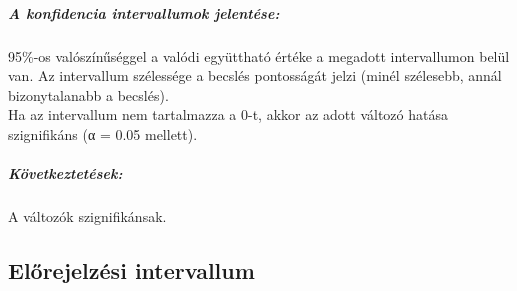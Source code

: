 \documentclass[11pt]{article}
\begin{document}
\subparagraph{A konfidencia intervallumok
jelentése:}\label{a-konfidencia-intervallumok-jelentuxe9se}

95\%-os valószínűséggel a valódi együttható értéke a megadott
intervallumon belül van. Az intervallum szélessége a becslés pontosságát
jelzi (minél szélesebb, annál bizonytalanabb a becslés).\\
Ha az intervallum nem tartalmazza a 0-t, akkor az adott változó hatása
szignifikáns (α = 0.05 mellett).

\subparagraph{Következtetések:}\label{kuxf6vetkeztetuxe9sek}

A változók szignifikánsak.

    \subsection{Előrejelzési
intervallum}\label{elux151rejelzuxe9si-intervallum}
\end{document}

